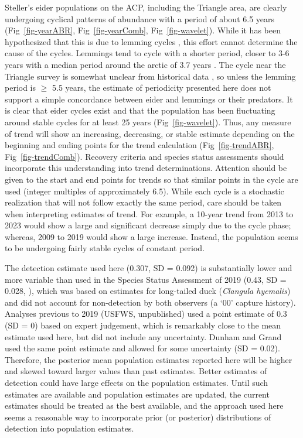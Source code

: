 \documentclass[
  10pt,
  letterpaper,
]{article}
\begin{document}
Steller's eider populations on the ACP, including the Triangle area, are
clearly undergoing cyclical patterns of abundance with a period of about
6.5 years (Fig~\ref{fig-yearABR}, Fig~\ref{fig-yearComb},
Fig~\ref{fig-wavelet}). While it has been hypothesized that this is due
to lemming cycles \citep{quakenbush2004breeding}, this effort cannot
determine the cause of the cycles. Lemmings tend to cycle with a shorter
period, closer to 3-6 years with a median period around the arctic of
3.7 years \citep{gauthier2024taking}. The cycle near the Triangle survey
is somewhat unclear from historical data \citep{pitelka2018demography},
so unless the lemming period is \(\ge\) 5.5 years, the estimate of
periodicity presented here does not support a simple concordance between
eider and lemmings or their predators. It is clear that eider cycles
exist and that the population has been fluctuating around stable cycles
for at least 25 years (Fig~\ref{fig-wavelet}). Thus, any measure of trend will show an increasing, decreasing, or stable estimate depending on the beginning and ending points for the trend calculation (Fig~\ref{fig-trendABR}, Fig~\ref{fig-trendComb}). Recovery criteria and species status
assessments should incorporate this understanding into trend
determinations. Attention should be given to the start and end points
for trends so that similar points in the cycle are used (integer multiples of approximately 6.5). While each cycle is a stochastic realization that
will not follow exactly the same period, care should be taken when
interpreting estimates of trend. For example, a 10-year trend from 2013
to 2023 would show a large and significant decrease simply due to the
cycle phase; whereas, 2009 to 2019 would show a large increase. Instead,
the population seems to be undergoing fairly stable cycles of constant
period.

The detection estimate used here (0.307, SD = 0.092) is substantially
lower and more variable than used in the Species Status Assessment of
2019 (0.43, SD = 0.028, \citep{steiSSA2019}), which was based on
estimates for long-tailed duck (\emph{Clangula hyemalis}) and did not account for non-detection by both observers (a `00' capture history). Analyses previous to 2019 (USFWS, unpublished) used a point estimate of 0.3 (SD = 0) based on expert judgement, which is remarkably close to the mean estimate used here, but did not include any uncertainty. Dunham and Grand \citep{dunham2017evaluating} used the same point estimate and allowed for some uncertainty (SD = 0.02). Therefore, the posterior mean
population estimates reported here will be higher and skewed toward
larger values than past estimates. Better estimates of detection could
have large effects on the population estimates. Until such estimates are
available and population estimates are updated, the current estimates
should be treated as the best available, and the approach used here
seems a reasonable way to incorporate prior (or posterior) distributions
of detection into population estimates.
\end{document}
